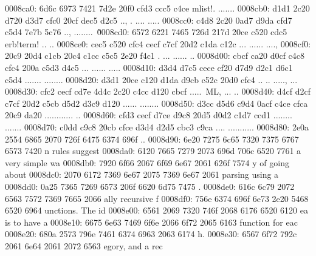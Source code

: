 \begin{bo
00010e0: 7865 647d 5c62 6567 696e 7b76 6572 6261  xed}
\begin{verba
00010f0: 7469 6d7d 0a20 2023 7479 7065 2074 6572  tim}
\begin{
0001c40: 7665 7262 6174 696d 7d0a 2020 236c 6574  verbatim}
\begin{boxe
00027a0: 647d 5c62 6567 696e 7b76 6572 6261 7469  d}
\begin{verbati
00027b0: 6d7d 0a20 2023 6c65 7420 696e 6669 7865  m}
\begin{v
0002c60: 6572 6261 7469 6d7d 0a20 2023 6c65 7420  erbatim}
\begin{
0002dc0: 7665 7262 6174 696d 7d0a 2020 236c 6574  verbatim}
\begin{boxed
0002f30: 7d5c 6265 6769 6e7b 7665 7262 6174 696d  }
\begin{verbatim
0002f40: 7d0a 2020 236c 6574 2068 6428 683a 3a74  }
\begin{v
0003e60: 6572 6261 7469 6d7d 0a20 2023 236f 7065  erbatim}
\begin{boxed
00042b0: 7d5c 6265 6769 6e7b 7665 7262 6174 696d  }
\begin{verbatim
00042c0: 7d0a 2020 2328 782c 7429 3b3b 0a20 202d  }
\begin{boxed}
{0008ca0: 6d6c 6973 7421 7d2e 20f0 cfd3 ccc5 c4ce  mlist!}. .......
0008cb0: d1d1 2c20 d720 d3d7 cfc0 20cf dec5 d2c5  .., . .... .....
0008cc0: c4d8 2c20 0ad7 d9da cfd7 c5d4 7e7b 5c76  .., ........~{\v
0008cd0: 6572 6221 7465 726d 217d 20ce c520 cdc5  erb!term!} .. ..
0008ce0: cec5 c520 cfc4 cecf c7cf 20d2 c1da c12c  ... ...... ....,
0008cf0: 20c9 20d4 c1cb 20c4 c1cc c5c5 2e20 f4c1   . ... ...... ..
0008d00: cbcf ca20 d0cf c4c8 cfc4 200a c5d3 d4c5  ... ...... .....
0008d10: d3d4 d7c5 cece cf20 d7d9 d2c1 d6c1 c5d4  ....... ........
0008d20: d3d1 20ce c120 d1da d9cb c52c 20d0 cfc4  .. .. ....., ...
0008d30: cfc2 cecf cd7e 4d4c 2c20 c4cc d120 cbcf  .....~ML, ... ..
0008d40: d4cf d2cf c7cf 20d2 c5cb d5d2 d3c9 d120  ...... ........ 
0008d50: d3cc d5d6 c9d4 0acf c4ce cfca 20c9 da20  ............ .. 
0008d60: cfd3 cecf d7ce d9c8 20d5 d0d2 c1d7 ccd1  ........ .......
0008d70: c0dd c9c8 20cb cfce d3d4 d2d5 cbc3 c9ca  .... ...........
0008d80: 2e0a 2554 6865 2070 726f 6475 6374 696f  ..%
0008d90: 6e20 7275 6c65 7320 7375 6767 6573 7420  n rules suggest 
0008da0: 6120 7665 7279 2073 696d 706c 6520 7761  a very simple wa
0008db0: 7920 6f66 2067 6f69 6e67 2061 626f 7574  y of going about
0008dc0: 2070 6172 7369 6e67 2075 7369 6e67 2061   parsing using a
0008dd0: 0a25 7365 7269 6573 206f 6620 6d75 7475  .%
0008de0: 616c 6c79 2072 6563 7572 7369 7665 2066  ally recursive f
0008df0: 756e 6374 696f 6e73 2e20 5468 6520 6964  unctions. The id
0008e00: 6561 2069 7320 746f 2068 6176 6520 6120  ea is to have a 
0008e10: 6675 6e63 7469 6f6e 2066 6f72 2065 6163  function for eac
0008e20: 680a 2573 796e 7461 6374 6963 2063 6174  h.%
0008e30: 6567 6f72 792c 2061 6e64 2061 2072 6563  egory, and a rec

\end{boxed}
\end{verbatim
00042c0: 7d0a 2020 2328 782c 7429 3b3b 0a20 202d  }
\end{boxed
00042b0: 7d5c 6265 6769 6e7b 7665 7262 6174 696d  }
\end{v
0003e60: 6572 6261 7469 6d7d 0a20 2023 236f 7065  erbatim}
\end{verbatim
0002f40: 7d0a 2020 236c 6574 2068 6428 683a 3a74  }
\end{boxed
0002f30: 7d5c 6265 6769 6e7b 7665 7262 6174 696d  }
\end{
0002dc0: 7665 7262 6174 696d 7d0a 2020 236c 6574  verbatim}
\end{v
0002c60: 6572 6261 7469 6d7d 0a20 2023 6c65 7420  erbatim}
\end{verbati
00027b0: 6d7d 0a20 2023 6c65 7420 696e 6669 7865  m}
\end{boxe
00027a0: 647d 5c62 6567 696e 7b76 6572 6261 7469  d}
\end{
0001c40: 7665 7262 6174 696d 7d0a 2020 236c 6574  verbatim}
\end{verba
00010f0: 7469 6d7d 0a20 2023 7479 7065 2074 6572  tim}
\end{bo
00010e0: 7865 647d 5c62 6567 696e 7b76 6572 6261  xed}
